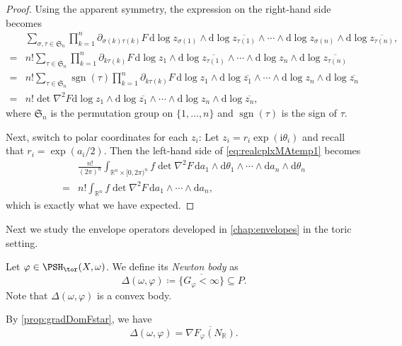 \begin{proof}
    Using the apparent symmetry, the expression on the right-hand side becomes
    \[
    \begin{aligned}
    &\sum_{\sigma,\tau\in \mathfrak{S}_n}\prod_{k=1}^n \partial_{\sigma(k)\tau(k)}F\,\mathrm{d}\log z_{\sigma(1)}\wedge \mathrm{d}\log \overline{z_{\tau(1)}}\wedge \cdots\wedge \mathrm{d}\log z_{\sigma(n)}\wedge \mathrm{d}\log \overline{z_{\tau(n)}},\\
    =& n!\sum_{\tau\in \mathfrak{S}_n}\prod_{k=1}^n \partial_{k\tau(k)}F\,\mathrm{d}\log z_{1}\wedge \mathrm{d}\log \overline{z_{\tau(1)}}\wedge \cdots\wedge \mathrm{d}\log z_{n}\wedge \mathrm{d}\log \overline{z_{\tau(n)}}\\
    =& n!\sum_{\tau\in \mathfrak{S}_n}\operatorname{sgn}(\tau)\prod_{k=1}^n \partial_{k\tau(k)}F\,\mathrm{d}\log z_{1}\wedge \mathrm{d}\log \overline{z_1}\wedge \cdots\wedge \mathrm{d}\log z_{n}\wedge \mathrm{d}\log \overline{z_n}\\
    =& n! \det \nabla^2 F\mathrm{d}\log z_{1}\wedge \mathrm{d}\log \overline{z_1}\wedge \cdots\wedge \mathrm{d}\log z_{n}\wedge \mathrm{d}\log \overline{z_n},
    \end{aligned}
    \]
    where $\mathfrak{S}_n$ is the permutation group on $\{1,\ldots,n\}$ and $\operatorname{sgn}(\tau)$ is the sign of $\tau$.

    Next, switch to polar coordinates for each $z_i$: Let $z_i=r_i\exp(\mathrm{i}\theta_i)$ and recall that $r_i=\exp(a_i/2)$. Then the left-hand side of \eqref{eq:realcplxMAtemp1} becomes
    \[
    \begin{split}
    &\frac{n!}{(2\pi)^n}\int_{\mathbb{R}^n\times [0,2\pi)^n} f \det \nabla^2 F \,\mathrm{d}a_1\wedge \mathrm{d}\theta_1\wedge \cdots\wedge \mathrm{d}a_n\wedge \mathrm{d}\theta_n\\
    =& n!\int_{\mathbb{R}^n}f\det \nabla^2 F \,\mathrm{d}a_1\wedge \cdots \wedge\mathrm{d}a_n,
    \end{split}
    \]
    which is exactly what we have expected.
\end{proof}

Next we study the envelope operators developed in \cref{chap:envelopes} in the toric setting.
\begin{definition}\label{def:Newtonbody1}
    Let $\varphi\in \PSH_{\tor}(X,\omega)$. We define its \emph{Newton body} as
    \[
    \Delta(\omega,\varphi)\coloneqq \overline{\{G_{\varphi}<\infty\}}\subseteq P.
    \]
    \index{$\Delta(\omega,\varphi)$}
    Note that $\Delta(\omega,\varphi)$ is a convex body.
\end{definition}
By \cref{prop:gradDomFstar}, we have
\[
\Delta(\omega,\varphi)=\overline{\nabla F_{\varphi}(N_{\mathbb{R}})}.
\]

